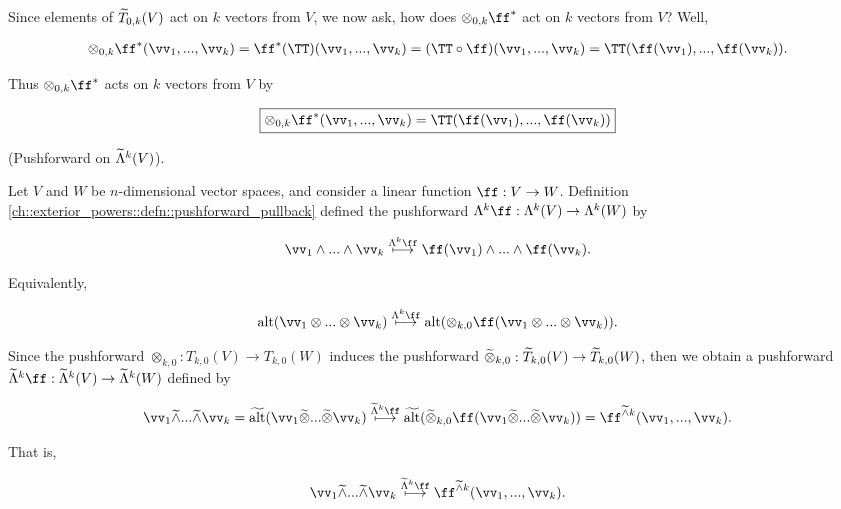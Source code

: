 \begin{deriv}
    Since elements of $\widetilde{T}_{0,k}(V)$ act on $k$ vectors from $V$, we now ask, how does $\otimes_{0, k} \ff^*$ act on $k$ vectors from $V$? Well,
    
    \begin{align*}
        \otimes_{0, k} \ff^*(\vv_1, ..., \vv_k) = \ff^*(\TT)(\vv_1, ..., \vv_k) = (\TT \circ \ff)(\vv_1, ..., \vv_k) = \TT(\ff(\vv_1), ..., \ff(\vv_k)).
    \end{align*}
    
    Thus $\otimes_{0, k} \ff^*$ acts on $k$ vectors from $V$ by
    
    \begin{align*}
        \boxed
        {
            \otimes_{0, k} \ff^*(\vv_1, ..., \vv_k) = \TT(\ff(\vv_1), ..., \ff(\vv_k))
        }
    \end{align*}
\end{deriv}

\begin{deriv}
    (Pushforward on $\widetilde{\Lambda}^k(V)$).
    
    Let $V$ and $W$ be $n$-dimensional vector spaces, and consider a linear function $\ff:V \rightarrow W$. Definition \ref{ch::exterior_powers::defn::pushforward_pullback} defined the pushforward $\Lambda^k \ff:\Lambda^k(V) \rightarrow \Lambda^k(W)$ by
    
    \begin{align*}
        \vv_1 \wedge ... \wedge \vv_k \overset{\Lambda^k \ff}{\longmapsto} \ff(\vv_1) \wedge ... \wedge \ff(\vv_k).
    \end{align*}
    
    Equivalently,
    
    \begin{align*}
        \alt(\vv_1 \otimes ... \otimes \vv_k) \overset{\Lambda^k \ff}{\longmapsto} \alt(\otimes_{k, 0} \ff(\vv_1 \otimes ... \otimes 
        \vv_k)).
    \end{align*}
    
    Since the pushforward $\otimes_{k, 0}:T_{k,0}(V) \rightarrow T_{k,0}(W)$ induces the pushforward $\widetilde{\otimes}_{k,0}:\widetilde{T}_{k,0}(V) \rightarrow \widetilde{T}_{k,0}(W)$, then we obtain a pushforward $\tLambda^k \ff:\tLambda^k(V) \rightarrow \tLambda^k(W)$ defined by
    
    \begin{align*}
        \vv_1 \twedge ... \twedge \vv_k = \talt(\vv_1 \totimes ... \totimes \vv_k) \overset{\tLambda^k \ff}{\longmapsto} \talt(\totimes_{k,0} \ff(\vv_1 \totimes ... \totimes \vv_k)) = \ff^{\twedge k}(\vv_1, ..., \vv_k).
    \end{align*}
    
    That is,
    
    \begin{align*}
        \vv_1 \twedge ... \twedge \vv_k \overset{\tLambda^k \ff}{\longmapsto} \ff^{\twedge k}(\vv_1, ..., \vv_k).
    \end{align*}
\end{deriv}

